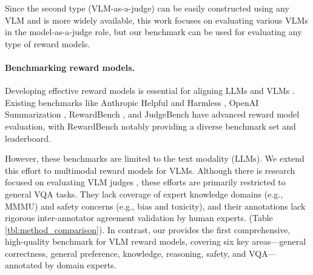Since the second type (VLM-as-a-judge) can be easily constructed using any VLM and is more widely available, this work focuses on evaluating various VLMs in the model-as-a-judge role, but our benchmark can be used for evaluating any type of reward models.


\paragraph{Benchmarking reward models.}
Developing effective reward models is essential for aligning LLMs and VLMs \citep{instructgpt, llama3}. Existing benchmarks like Anthropic Helpful and Harmless \citep{bai2022training}, OpenAI Summarization \citep{stiennon2020learning}, RewardBench \citep{lambert2024rewardbench}, and JudgeBench \citep{tan2024judgebench} have advanced reward model evaluation, with RewardBench notably providing a diverse benchmark set and leaderboard.

However, these benchmarks are limited to the text modality (LLMs). We extend this effort to multimodal reward models for VLMs. Although there is research focused on evaluating VLM judges \citep{lee2024prometheusvision, xiong2024llava, chen2024mllm, li2024vlrewardbench}, these efforts are primarily restricted to general VQA tasks. They lack coverage of expert knowledge domains (e.g., MMMU) and safety concerns (e.g., bias and toxicity), and their annotations lack rigorous inter-annotator agreement validation by human experts. (Table \ref{tbl:method_comparison}). In contrast, our \methodname provides the first comprehensive, high-quality benchmark for VLM reward models, covering six key areas---general correctness, general preference, knowledge, reasoning, safety, and VQA---annotated by domain experts.

